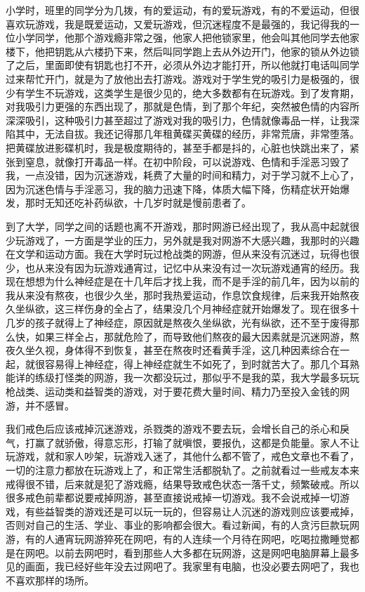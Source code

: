 小学时，班里的同学分为几拨，有的爱运动，有的爱玩游戏，有的不爱运动，但很喜欢玩游戏，我是既爱运动，又爱玩游戏，但沉迷程度不是最强的，我记得我的一位小学同学，他那个游戏瘾非常之强，他家人把他锁家里，他会叫其他同学去他家楼下，他把钥匙从六楼扔下来，然后叫同学跑上去从外边开门，他家的锁从外边锁了之后，里面即使有钥匙也打不开，必须从外边才能打开，所以他就打电话叫同学过来帮忙开门，就是为了放他出去打游戏。游戏对于学生党的吸引力是极强的，很少有学生不玩游戏，这类学生是很少见的，绝大多数都有在玩游戏。到了发育期，对我吸引力更强的东西出现了，那就是色情，到了那个年纪，突然被色情的内容所深深吸引，这种吸引力甚至超过了游戏对我的吸引力，色情就像毒品一样，让我深陷其中，无法自拔。我还记得那几年租黄碟买黄碟的经历，非常荒唐，非常堕落。把黄碟放进影碟机时，我是极度期待的，甚至手都是抖的，心脏也快跳出来了，紧张到窒息，就像打开毒品一样。在初中阶段，可以说游戏、色情和手淫恶习毁了我，一点没错，因为沉迷游戏，耗费了大量的时间和精力，对于学习就不上心了，因为沉迷色情与手淫恶习，我的脑力迅速下降，体质大幅下降，伤精症状开始爆发，那时无知还吃补药纵欲，十几岁时就是慢前患者了。

到了大学，同学之间的话题也离不开游戏，那时网游已经出现了，我从高中起就很少玩游戏了，一方面是学业的压力，另外就是我对网游不大感兴趣，我那时的兴趣在文学和运动方面。我在大学时玩过枪战类的网游，但从来没有沉迷过，玩得也很少，也从来没有因为玩游戏通宵过，记忆中从来没有过一次玩游戏通宵的经历。我现在想想为什么神经症是在十几年后才找上我，而不是手淫的前几年，因为以前的我从来没有熬夜，也很少久坐，那时我热爱运动，作息饮食规律，后来我开始熬夜久坐纵欲，这三样伤身的全占了，结果没几个月神经症就开始爆发了。现在很多十几岁的孩子就得上了神经症，原因就是熬夜久坐纵欲，光有纵欲，还不至于废得那么快，如果三样全占，那就危险了，而导致他们熬夜的最大因素就是沉迷网游，熬夜久坐久视，身体得不到恢复，甚至在熬夜时还看黄手淫，这几种因素综合在一起，就很容易得上神经症，得上神经症就生不如死了，到时就苦大了。那几个耳熟能详的练级打怪类的网游，我一次都没玩过，那似乎不是我的菜，我大学最多玩玩枪战类、运动类和益智类的游戏，对于要花费大量时间、精力乃至投入金钱的网游，并不感冒。

我们戒色后应该戒掉沉迷游戏，杀戮类的游戏不要去玩，会增长自己的杀心和戾气，打赢了就骄傲，得意忘形，打输了就嗔恨，要报仇，这都是负能量。家人不让玩游戏，就和家人吵架，玩游戏入迷了，其他什么都不管了，戒色文章也不看了，一切的注意力都放在玩游戏上了，和正常生活都脱轨了。之前就看过一些戒友本来戒得很不错，后来就是犯了游戏瘾，结果导致戒色状态一落千丈，频繁破戒。所以很多戒色前辈都说要戒掉网游，甚至直接说戒掉一切游戏。我不会说戒掉一切游戏，有些益智类的游戏还是可以玩一玩的，但容易让人沉迷的游戏则应该要戒掉，否则对自己的生活、学业、事业的影响都会很大。看过新闻，有的人贪污巨款玩网游，有的人通宵玩网游猝死在网吧，有的人连续一个月待在网吧，吃喝拉撒睡觉都是在网吧。以前去网吧时，看到那些人大多都在玩网游，这是网吧电脑屏幕上最多见的画面，我已经好些年没去过网吧了。我家里有电脑，也没必要去网吧了，我也不喜欢那样的场所。

